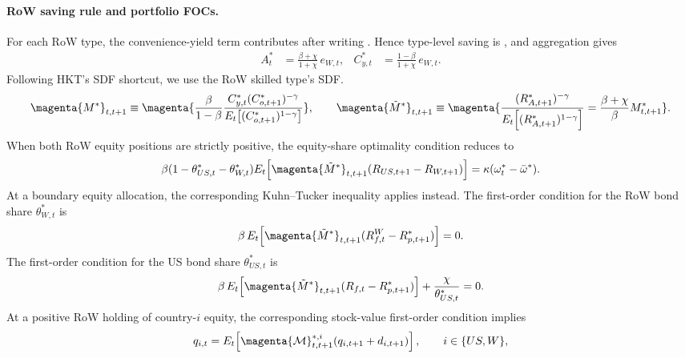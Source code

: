 \documentclass{article}
\def\green#1{#1}%
\begin{document}
\paragraph{RoW saving rule and portfolio FOCs.}
For each RoW type, the convenience-yield term contributes  after writing . Hence type-level saving is , and aggregation gives
\begin{align}\label{RoW_saving_rule_bond_cost}
A_t^*&=\frac{\beta+\chi}{1+\chi}\,e_{W,t},
&
C^*_{y,t}&=\frac{1-\beta}{1+\chi}\,e_{W,t}.
\end{align}
Following HKT's SDF shortcut, we use the RoW skilled type's SDF. 
\[
\magenta{M^*}_{t,t+1}
\equiv
\magenta{\frac{\beta}{1-\beta}
\frac{C^*_{y,t}(C^*_{o,t+1})^{-\gamma}}{E_t\!\left[(C^*_{o,t+1})^{1-\gamma}\right]}},
\qquad
\magenta{\tilde M^*}_{t,t+1}
\equiv
\magenta{\frac{(R_{A,t+1}^*)^{-\gamma}}{E_t\!\left[(R_{A,t+1}^*)^{1-\gamma}\right]}
=\frac{\beta+\chi}{\beta}M^*_{t,t+1}}.
\]
\green{When both} RoW equity \green{positions are strictly positive}, \green{the equity-share optimality condition reduces to}
\begin{align}\label{RoW_omega_FOC_mod}
\beta(1-\theta_{US,t}^*-\theta_{W,t}^*)
E_t\!\left[\magenta{\tilde M^*}_{t,t+1}(R_{US,t+1}-R_{W,t+1})\right]
=
\kappa(\omega_t^*-\bar\omega^*).
\end{align}
\green{At a boundary equity allocation}, \green{the corresponding Kuhn--Tucker inequality applies instead}.
The first-order condition for the RoW bond share $\theta_{W,t}^*$ is
\begin{align}\label{RoW_thetaW_FOC_mod}
\beta\,E_t\!\left[\magenta{\tilde M^*}_{t,t+1}(R_{f,t}^W-R_{p,t+1}^*)\right]
=
0.
\end{align}
The first-order condition for the US bond share $\theta_{US,t}^*$ is
\begin{align}\label{RoW_thetaUS_FOC_mod}
\beta\,E_t\!\left[\magenta{\tilde M^*}_{t,t+1}(R_{f,t}-R_{p,t+1}^*)\right]
+\frac{\chi}{\theta_{US,t}^*}
=
0.
\end{align}
\green{At a positive RoW holding of country-}$\green{i}$ \green{equity}, \green{the corresponding stock-value} first-order \green{condition implies}
\begin{equation}\label{RoW_stock_pricing}
q_{i,t}
=
E_t\!\left[\magenta{\mathcal M}^{*,i}_{t,t+1}(q_{i,t+1}+d_{i,t+1})\right],
\qquad i\in\{US,W\},
\end{equation}
\end{document}
